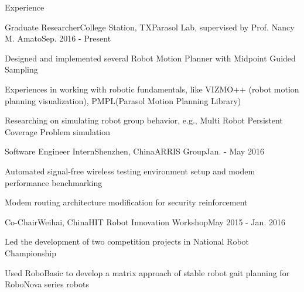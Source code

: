 \documentclass{resume} %
\begin{document}

\begin{rSection}{Experience}
\begin{rSubsection}{Graduate Researcher}{College Station, TX}{Parasol Lab, supervised by Prof. Nancy M. Amato}{Sep. 2016 - Present}
\item Designed and implemented several Robot Motion Planner with Midpoint Guided Sampling
\item Experiences in working with robotic fundamentals, like VIZMO++ (robot motion planning visualization), PMPL(Parasol Motion Planning Library)
\item Researching on simulating robot group behavior, e.g., Multi Robot Persistent Coverage Problem simulation
\end{rSubsection}

\begin{rSubsection}{Software Engineer Intern}{Shenzhen, China}{ARRIS Group}{Jan. - May 2016}
\item Automated signal-free wireless testing environment setup and modem performance benchmarking
\item Modem routing architecture modification for security reinforcement
\end{rSubsection}
\begin{rSubsection}{Co-Chair}{Weihai, China}{HIT Robot Innovation Workshop}{May 2015 - Jan. 2016}
\item Led the development of two competition projects in National Robot Championship
\item Used RoboBasic to develop a matrix approach of stable robot gait planning for RoboNova series robots
\end{rSubsection}
\end{rSection}
\end{document}
